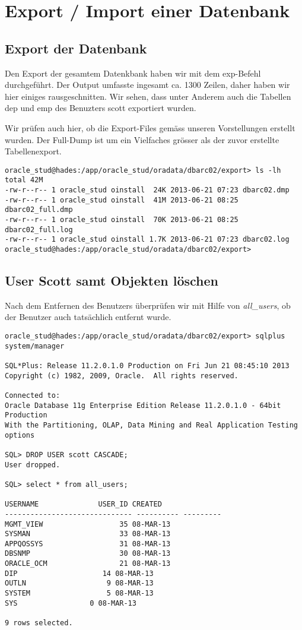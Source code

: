 \documentclass[11pt,a4paper,parskip=half]{scrartcl}
\begin{document}
\section{Export / Import einer Datenbank}
\subsection{Export der Datenbank}
Den Export der gesamtem Datenkbank haben wir mit dem exp-Befehl durchgeführt. Der Output umfasste ingesamt ca. 1300 Zeilen, daher haben wir hier einiges rausgeschnitten. Wir sehen, dass unter Anderem auch die Tabellen \glqq{}dep\grqq{} und \glqq{}emp\grqq{} des Benuzters scott exportiert wurden.


Wir prüfen auch hier, ob die Export-Files gemäss unseren Vorstellungen erstellt wurden. Der Full-Dump ist um ein Vielfaches grösser als der zuvor erstellte Tabellenexport.
\begin{lstlisting}
oracle_stud@hades:/app/oracle_stud/oradata/dbarc02/export> ls -lh
total 42M
-rw-r--r-- 1 oracle_stud oinstall  24K 2013-06-21 07:23 dbarc02.dmp
-rw-r--r-- 1 oracle_stud oinstall  41M 2013-06-21 08:25 dbarc02_full.dmp
-rw-r--r-- 1 oracle_stud oinstall  70K 2013-06-21 08:25 dbarc02_full.log
-rw-r--r-- 1 oracle_stud oinstall 1.7K 2013-06-21 07:23 dbarc02.log
oracle_stud@hades:/app/oracle_stud/oradata/dbarc02/export>
\end{lstlisting}

\subsection{User Scott samt Objekten löschen}
Nach dem Entfernen des Benutzers überprüfen wir mit Hilfe von \emph{all\_users}, ob der Benutzer auch tatsächlich entfernt wurde.
\begin{lstlisting}
oracle_stud@hades:/app/oracle_stud/oradata/dbarc02/export> sqlplus system/manager

SQL*Plus: Release 11.2.0.1.0 Production on Fri Jun 21 08:45:10 2013
Copyright (c) 1982, 2009, Oracle.  All rights reserved.

Connected to:
Oracle Database 11g Enterprise Edition Release 11.2.0.1.0 - 64bit Production
With the Partitioning, OLAP, Data Mining and Real Application Testing options

SQL> DROP USER scott CASCADE;
User dropped.

SQL> select * from all_users;

USERNAME			  USER_ID CREATED
------------------------------ ---------- ---------
MGMT_VIEW			       35 08-MAR-13
SYSMAN				       33 08-MAR-13
APPQOSSYS			       31 08-MAR-13
DBSNMP				       30 08-MAR-13
ORACLE_OCM			       21 08-MAR-13
DIP				       14 08-MAR-13
OUTLN					9 08-MAR-13
SYSTEM					5 08-MAR-13
SYS					0 08-MAR-13

9 rows selected.
\end{lstlisting}
\end{document}
